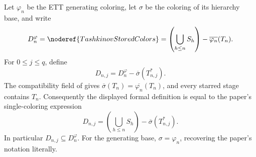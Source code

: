 \begin{definition}
Let $\varphi_n$ be the ETT generating coloring, let $\sigma$ be the
coloring of its hierarchy base, and write
\[
 D_n^{\varphi}=\noderef{TashkinovStoredColors}
   =\left(\bigcup_{h\leq n}S_h\right)
      -\overline{\varphi_n}(T_n).
\]
For $0\leq j\leq q$, define
\[
 D_{n,j}=D_n^{\varphi}-\overline\sigma(T_{n,j}^{*}).
\]
The compatibility field of  gives
$\overline\sigma(T_n)=\overline{\varphi_n}(T_n)$, and every starred
stage contains $T_n$.  Consequently the displayed formal definition is
equal to the paper's single-coloring expression
\[
 D_{n,j}=\left(\bigcup_{h\leq n}S_h\right)
       -\overline\sigma(T_{n,j}^{*}).
\]
In particular $D_{n,j}\subseteq D_n^{\varphi}$.  For the generating
base, $\sigma=\varphi_n$, recovering the paper's notation literally.
\end{definition}
